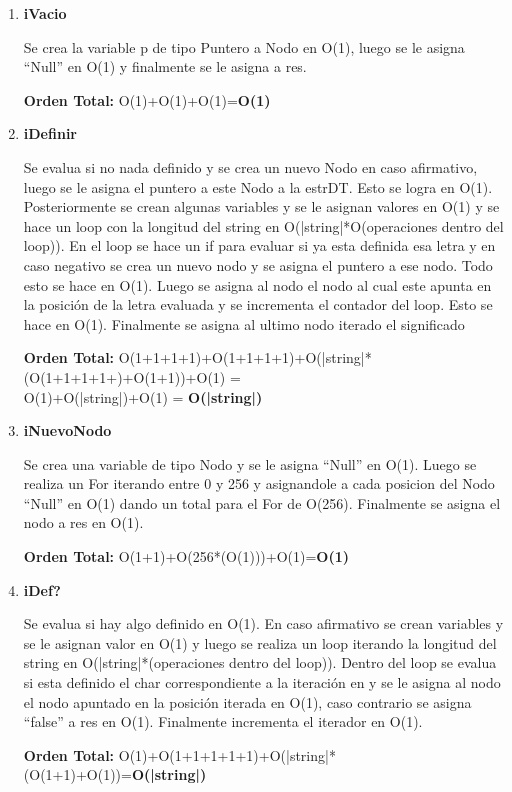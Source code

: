 \vspace*{1em}
\begin{enumerate}

\item\textbf{iVacio}
\par Se crea la variable p de tipo Puntero a Nodo en O(1), luego se le asigna ``Null'' en O(1) y finalmente se le asigna a res. 
\par \textbf{Orden Total:} O(1)+O(1)+O(1)=\textbf{O(1)}

\item\textbf{iDefinir}
\par Se evalua si no nada definido y se crea un nuevo Nodo en caso afirmativo, luego se le asigna el puntero a este Nodo a la estrDT. Esto se logra en O(1).
Posteriormente se crean algunas variables y se le asignan valores en O(1) y se hace un loop con la longitud del string en O(|string|*O(operaciones dentro del loop)). En el loop se hace un if para evaluar si ya esta definida esa letra y en caso negativo se crea un nuevo nodo y se asigna el puntero a ese nodo. Todo esto se hace en O(1). Luego se asigna al nodo el nodo al cual este apunta en la posición de la letra evaluada y se incrementa el contador del loop. Esto se hace en O(1). Finalmente se asigna al ultimo nodo iterado el significado 
\par \textbf{Orden Total:} O(1+1+1+1)+O(1+1+1+1)+O(|string|*(O(1+1+1+1+)+O(1+1))+O(1) =\\
O(1)+O(|string|)+O(1) = \textbf{O(|string|)}

\item\textbf{iNuevoNodo}
\par Se crea una variable de tipo Nodo y se le asigna ``Null'' en O(1). Luego se realiza un For iterando entre 0 y 256 y asignandole a cada posicion del Nodo ``Null'' en O(1) dando un total para el For de O(256). Finalmente se asigna el nodo a res en O(1).
\par \textbf{Orden Total:} O(1+1)+O(256*(O(1)))+O(1)=\textbf{O(1)}

\item\textbf{iDef?}
\par Se evalua si hay algo definido en O(1). En caso afirmativo se crean variables y se le asignan valor en O(1) y luego se realiza un loop iterando la longitud del string en O(|string|*(operaciones dentro del loop)). Dentro del loop se evalua si esta definido el char correspondiente a la iteración en y se le asigna al nodo el nodo apuntado en la posición iterada en O(1), caso contrario se asigna ``false'' a res en O(1). Finalmente incrementa el iterador en O(1).
\par \textbf{Orden Total:} O(1)+O(1+1+1+1+1)+O(|string|*(O(1+1)+O(1))=\textbf{O(|string|)}


\end{enumerate}
